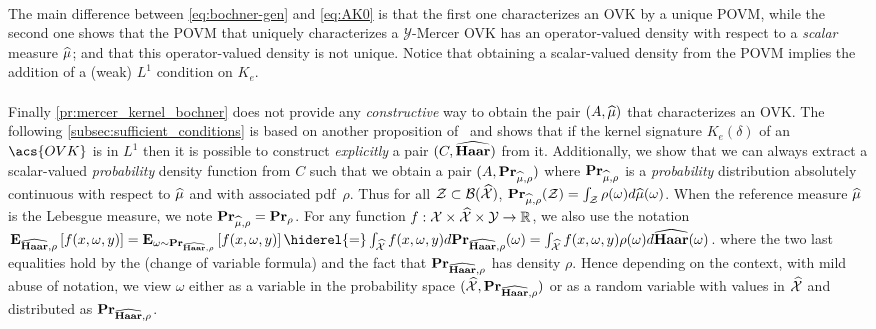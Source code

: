\documentclass[twoside,11pt]{article}
\begin{document}
\paragraph{}
The main difference between \cref{eq:bochner-gen} and
\cref{eq:AK0} is that the first one characterizes an \acs{OVK}
by a unique \acf{POVM}, while the second one shows that the \acs{POVM} that
uniquely characterizes a $\mathcal{Y}$-Mercer \acs{OVK} has an operator-valued
density with respect to a \emph{scalar} measure $\widehat{\mu}$; and that this
operator-valued density is not unique. Notice that obtaining a scalar-valued
density from the \acs{POVM} implies the addition of a (weak) $L^1$ condition on
$K_e$.
\paragraph{}
Finally \cref{pr:mercer_kernel_bochner} does not provide any
\emph{constructive} way to obtain the pair $(A,\widehat{\mu})$ that characterizes
an \acs{OVK}. The following \cref{subsec:sufficient_conditions} is based on
another proposition of~\citeauthor{carmeli2006vector} and shows that if the
kernel signature $K_e(\delta)$ of an $\acs{OVK}$ is in $L^1$ then it is
possible to construct \emph{explicitly} a pair $(C,\widehat{\mathbf{Haar}})$ from it.
Additionally, we show that we can always extract a scalar-valued
\emph{probability} density function from $C$ such that we obtain a pair
$(A,{\mathbf{{Pr}}}_{\widehat{\mu},\rho})$ where ${\mathbf{{Pr}}}_{\widehat{\mu},\rho}$ is
a \emph{probability} distribution absolutely continuous with respect to
$\widehat{\mu}$ and with associated \ac{pdf}~$\rho$. Thus for all
$\mathcal{Z}\subset\mathcal{B}(\widehat{\mathcal{X}})$,
${\mathbf{{Pr}}}_{\widehat{\mu},\rho}(\mathcal{Z})=\int_{\mathcal{Z}}
\rho(\omega)d\widehat{\mu}(\omega)$.  When the reference measure $\widehat{\mu}$ is
the Lebesgue measure, we note
${\mathbf{{Pr}}}_{\widehat{\mu},\rho}={\mathbf{{Pr}}}_\rho$. For any function
$f:\mathcal{X}\times\widehat{\mathcal{X}}\times\mathcal{Y}\to\mathbb{R}$, we also
use the notation $\expectation_{\dual{\Haar}, \rho}\left[f(x, \omega, y)\right]
=\expectation_{\omega\sim\probability_{\dual{\Haar},\rho}}\left[f(x, \omega,
y)\right] \hiderel{=}\int_{\dual{\mathcal{X}}} f(x, \omega, y)
d\probability_{\dual{\Haar}, \rho}(\omega) =\int_{\dual{\mathcal{X}}} f(x,
\omega, y)\rho(\omega) d\dual{\Haar}(\omega)$.  where the two last equalities
hold by the  (change of variable
formula) and the fact that ${\mathbf{{Pr}}}_{\widehat{\mathbf{Haar}}, \rho}$ has density
$\rho$. Hence depending on the context, with mild abuse of notation, we view
$\omega$ either as a variable in the probability space $(\widehat{\mathcal{X}},
{\mathbf{{Pr}}}_{\widehat{\mathbf{Haar}}, \rho})$ or as a random variable  with values in
$\widehat{\mathcal{X}}$ and distributed as ${\mathbf{{Pr}}}_{\widehat{\mathbf{Haar}}, \rho}$.
\end{document}
